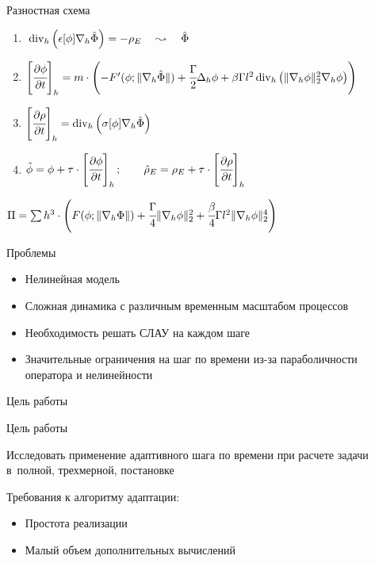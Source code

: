 \begin{frame}{Разностная схема}
\vspace{-3mm}
\begin{enumerate}
	\item $\; \operatorname{{div}}_h \left( \epsilon[\phi] \nabla_h \hat{\Phi} \right) = - \rho_E \quad \leadsto \quad \hat{\Phi}$
	\item $\left[ \cfrac{\partial \phi}{\partial t} \right]_h = m \cdot \left( -F'( \phi; \| \nabla_h \hat{\Phi} \|) + \cfrac{\Gamma}{2} \Delta_h \phi + \beta \Gamma l^2 \operatorname{{div}}_h \left( \| \nabla_h \phi \|_2^2 \nabla_h \phi \right) \right)$
	\item $\left[ \cfrac{\partial \rho}{\partial t} \right]_h = \operatorname{{div}}_h \left( \sigma[\phi] \nabla_h \hat{\Phi} \right)$
	\item $\hat{\phi} = \phi + \tau \cdot \left[ \cfrac{\partial \phi}{\partial t} \right]_h; \qquad \hat{\rho}_E = \rho_E + \tau \cdot \left[ \cfrac{\partial \rho}{\partial t} \right]_h$
\end{enumerate}
\vspace{2mm}
\parind $\Pi = \sum h^3 \cdot \left( F(\phi; \| \nabla_h \Phi \|) + \cfrac{\Gamma}{4} \| \nabla_h \phi \|_2^2 + \cfrac{\beta}{4} \Gamma l^2 \| \nabla_h \phi \|_2^4 \right)$
\end{frame}


\begin{frame}{Проблемы}
\large
\begin{itemize}
	\setlength\itemsep{3mm}
	\item Нелинейная модель
	\item Сложная динамика с различным временным масштабом процессов
	\item Необходимость решать СЛАУ на каждом шаге
	\item Значительные ограничения на шаг по времени из-за параболичности оператора и нелинейности
\end{itemize}
\end{frame}


\begin{frame}{Цель работы}
\large
\vspace{-3mm}
\begin{center}
\begin{minipage}{0.95\textwidth}
\begin{block}{\Large Цель работы \par}
	Исследовать применение адаптивного шага по времени при расчете задачи в~полной, трехмерной, постановке
\end{block}
\end{minipage}
\end{center}
\vspace{3mm}
\parind Требования к алгоритму адаптации:
\begin{itemize}
	\item Простота реализации
	\item Малый объем дополнительных вычислений
\end{itemize}
\end{frame}